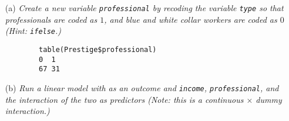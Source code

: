 \documentclass[12pt,letterpaper]{article}
\begin{document}
	\newpage
	\begin{enumerate}
		
		\item [(a)]
		\textit{Create a new variable \texttt{professional} by recoding the variable \texttt{type} so that professionals are coded as $1$, and blue and white collar workers are coded as $0$ (Hint: \texttt{ifelse}.)}
		
		 
							
		\begin{verbatim}	
		table(Prestige$professional)
		0  1 
		67 31 
		\end{verbatim}
		
				 		\vspace{1cm}
		
		\item [(b)]
		\textit{Run a linear model with  as an outcome and \texttt{income}, \texttt{professional}, and the interaction of the two as predictors (Note: this is a continuous $\times$ dummy interaction.)}
				 		\vspace{.25cm}
				 		

\end{enumerate}
\end{document}
